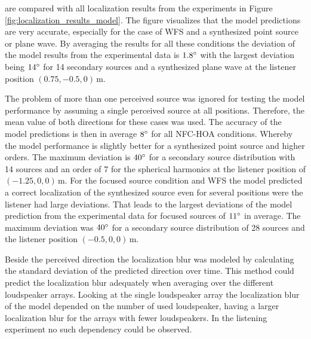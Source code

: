 \renewcommand{\thefigure}{\thechapter.\arabic{figure}} %
%
 are compared with all localization results
from the experiments in Figure\,\ref{fig:localization_results_model}.
The figure visualizes that the model predictions are very accurate, especially for the
case of \ac{WFS} and a synthesized point source or plane wave. By averaging the
results for all these conditions the deviation of the model results from the
experimental data is $1.8^\circ$ with the largest deviation being $14^\circ$ 
for 14 secondary sources and a synthesized plane wave at the listener position
$(0.75,-0.5,0)$\,m.

The problem of more than one perceived source was
ignored for testing the model performance by assuming a single perceived source
at all positions. Therefore, the mean value of both directions for
these cases was used. The accuracy of the model predictions is then in average $8^\circ$
for all \ac{NFC-HOA} conditions. Whereby the model performance is slightly
better for a synthesized point source and higher orders. The maximum deviation
is $40^\circ$ for a secondary source distribution with 14 sources and an
order of 7 for the spherical harmonics at the listener position of $(-1.25,0,0)$\,m.
For the focused source condition and \ac{WFS} the model predicted a correct
localization of the synthesized source even for several positions were the listener
had large deviations.
That leads to the largest deviations of the model prediction from the
experimental data for focused sources of $11^\circ$ in average. The maximum
deviation was $40^\circ$ for a secondary source distribution of 28 sources and
the listener position $(-0.5,0,0)$\,m.

Beside the perceived direction the localization blur was modeled by calculating
the standard deviation of the predicted direction over time.
This method could predict the localization blur adequately when averaging
over the different loudspeaker arrays. Looking at the single loudspeaker array
the localization blur of the model depended on the number of used loudspeaker,
having a larger localization blur for the arrays with fewer loudspeakers. In the
listening experiment no such dependency could be observed.

